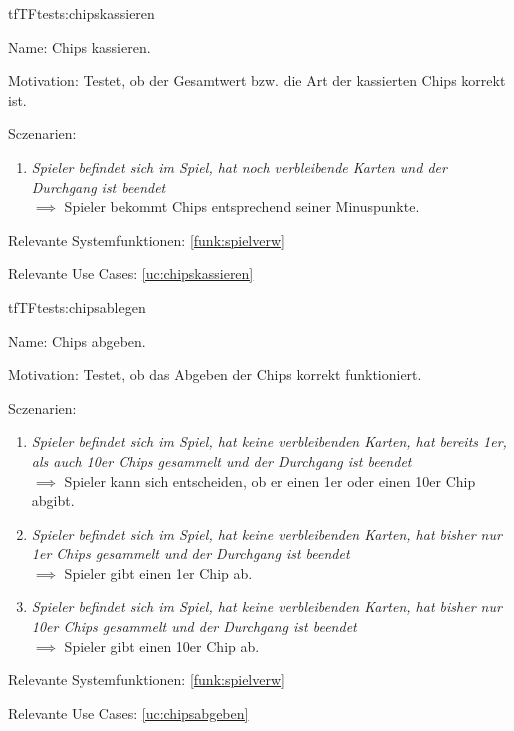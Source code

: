 \begin{description}[leftmargin=5em, style=sameline]
\begin{lhp}{tf}{TF}{tests:chipskassieren}
	\item [Name:] Chips kassieren.
	\item [Motivation:] Testet, ob der Gesamtwert bzw. die Art der kassierten Chips korrekt ist.
	\item [Sczenarien:] \hfill
		\begin{enumerate}
			\item \textit{Spieler befindet sich im Spiel, hat noch verbleibende Karten und der Durchgang ist beendet} \\ $\implies$ Spieler bekommt Chips entsprechend seiner Minuspunkte.
		\end{enumerate}
	\item [Relevante Systemfunktionen:] \ref{funk:spielverw}
	\item [Relevante Use Cases:] \ref{uc:chipskassieren}
\end{lhp}



\begin{lhp}{tf}{TF}{tests:chipsablegen}
	\item [Name:] Chips abgeben.
	\item [Motivation:] Testet, ob das Abgeben der Chips korrekt funktioniert.
	\item [Sczenarien:] \hfill
		\begin{enumerate}
			\item \textit{Spieler befindet sich im Spiel, hat keine verbleibenden Karten, hat bereits 1er, als auch 10er Chips gesammelt und der Durchgang ist beendet} \\ $\implies$ Spieler kann sich entscheiden, ob er einen 1er oder einen 10er Chip abgibt.
			\item \textit{Spieler befindet sich im Spiel, hat keine verbleibenden Karten, hat bisher nur 1er Chips gesammelt und der Durchgang ist beendet} \\ $\implies$ Spieler gibt einen 1er Chip ab.
			\item \textit{Spieler befindet sich im Spiel, hat keine verbleibenden Karten, hat bisher nur 10er Chips gesammelt und der Durchgang ist beendet} \\ $\implies$ Spieler gibt einen 10er Chip ab.
		\end{enumerate}
	\item [Relevante Systemfunktionen:] \ref{funk:spielverw}
	\item [Relevante Use Cases:] \ref{uc:chipsabgeben}
\end{lhp}



\end{description}
